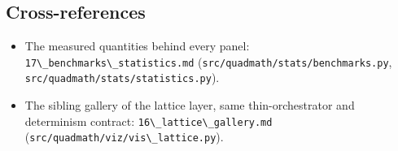 \documentclass[
  10pt,
]{article}
\newcommand{\passthrough}[1]{#1}
\providecommand{\tightlist}{%
  \setlength{\itemsep}{0pt}\setlength{\parskip}{0pt}}
\begin{document}
\subsection{Cross-references}\label{cross-references-5}

\begin{itemize}
\tightlist
\item
  The measured quantities behind every panel:
  \passthrough{\lstinline!17\_benchmarks\_statistics.md!}
  (\passthrough{\lstinline!src/quadmath/stats/benchmarks.py!},
  \passthrough{\lstinline!src/quadmath/stats/statistics.py!}).
\item
  The sibling gallery of the lattice layer, same thin-orchestrator and
  determinism contract:
  \passthrough{\lstinline!16\_lattice\_gallery.md!}
  (\passthrough{\lstinline!src/quadmath/viz/vis\_lattice.py!}).
\end{itemize}
\end{document}
